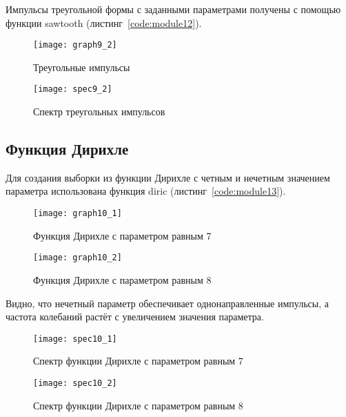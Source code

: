 Импульсы треугольной формы с заданными параметрами получены с помощью функции sawtooth (листинг~\ref{code:module12}).

\begin{figure}[H]
	\begin{center}
		\texttt{[image: graph9\_2]}
		\caption{Треугольные импульсы} 
		\label{pic:graph9_2} %
	\end{center}
\end{figure}
\begin{figure}[H]
	\begin{center}
		\texttt{[image: spec9\_2]}
		\caption{Спектр треугольных импульсов} 
		\label{pic:spec9_2} %
	\end{center}
\end{figure}

\subsection{Функция Дирихле}

Для создания выборки из функции Дирихле с четным и нечетным значением параметра использована 
функция diric (листинг~\ref{code:module13}).

\begin{figure}[H]
	\begin{center}
		\texttt{[image: graph10\_1]}
		\caption{Функция Дирихле с параметром равным 7} 
		\label{pic:graph10_1} %
	\end{center}
\end{figure}
\begin{figure}[H]
	\begin{center}
		\texttt{[image: graph10\_2]}
		\caption{Функция Дирихле с параметром равным 8} 
		\label{pic:graph10_2} %
	\end{center}
\end{figure}
Видно, что нечетный параметр обеспечивает однонаправленные импульсы, а частота колебаний растёт с увеличением значения параметра.

\begin{figure}[H]
	\begin{center}
		\texttt{[image: spec10\_1]}
		\caption{Спектр функции Дирихле с параметром равным 7} 
		\label{pic:spec10_1} %
	\end{center}
\end{figure}
\begin{figure}[H]
	\begin{center}
		\texttt{[image: spec10\_2]}
		\caption{Спектр функции Дирихле с параметром равным 8} 
		\label{pic:spec10_2} %
	\end{center}
\end{figure}


